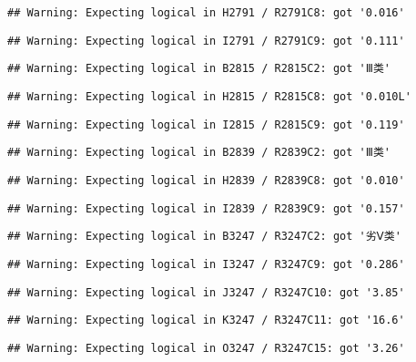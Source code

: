 \documentclass[
]{article}
\begin{document}
\begin{verbatim}
## Warning: Expecting logical in H2791 / R2791C8: got '0.016'
\end{verbatim}

\begin{verbatim}
## Warning: Expecting logical in I2791 / R2791C9: got '0.111'
\end{verbatim}

\begin{verbatim}
## Warning: Expecting logical in B2815 / R2815C2: got 'Ⅲ类'
\end{verbatim}

\begin{verbatim}
## Warning: Expecting logical in H2815 / R2815C8: got '0.010L'
\end{verbatim}

\begin{verbatim}
## Warning: Expecting logical in I2815 / R2815C9: got '0.119'
\end{verbatim}

\begin{verbatim}
## Warning: Expecting logical in B2839 / R2839C2: got 'Ⅲ类'
\end{verbatim}

\begin{verbatim}
## Warning: Expecting logical in H2839 / R2839C8: got '0.010'
\end{verbatim}

\begin{verbatim}
## Warning: Expecting logical in I2839 / R2839C9: got '0.157'
\end{verbatim}

\begin{verbatim}
## Warning: Expecting logical in B3247 / R3247C2: got '劣Ⅴ类'
\end{verbatim}

\begin{verbatim}
## Warning: Expecting logical in I3247 / R3247C9: got '0.286'
\end{verbatim}

\begin{verbatim}
## Warning: Expecting logical in J3247 / R3247C10: got '3.85'
\end{verbatim}

\begin{verbatim}
## Warning: Expecting logical in K3247 / R3247C11: got '16.6'
\end{verbatim}

\begin{verbatim}
## Warning: Expecting logical in O3247 / R3247C15: got '3.26'
\end{verbatim}
\end{document}

